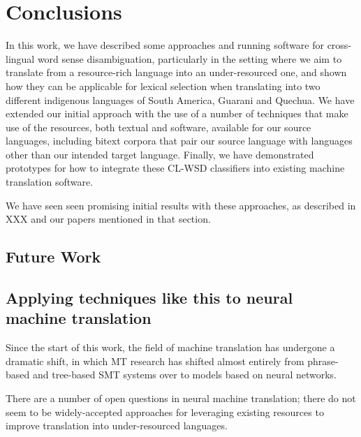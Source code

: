 \chapter{Conclusions}
\label{chap:conclusions}

In this work, we have described some approaches and running software for
cross-lingual word sense disambiguation, particularly in the setting where we
aim to translate from a resource-rich language into an under-resourced one, and
shown how they can be applicable for lexical selection when translating into
two different indigenous languages of South America, Guarani and Quechua. We
have extended our initial approach with the use of a number of techniques that
make use of the resources, both textual and software, available for our source
languages, including bitext corpora that pair our source language with
languages other than our intended target language. Finally, we have
demonstrated prototypes for how to integrate these CL-WSD classifiers into
existing machine translation software.

We have seen seen promising initial results with these approaches, as described
in XXX and our papers mentioned in that section.


\section{Future Work}

\section{Applying techniques like this to neural machine translation}
Since the start of this work, the field of machine translation has undergone a
dramatic shift, in which MT research has shifted almost entirely from
phrase-based and tree-based SMT systems over to models based on neural
networks.

There are a number of open questions in neural machine translation; there do
not seem to be widely-accepted approaches for leveraging existing resources to
improve translation into under-resourced languages.



